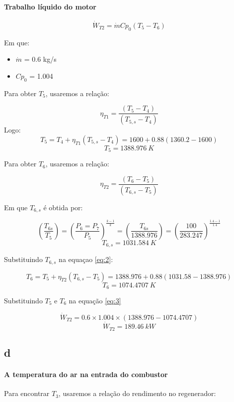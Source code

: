 \paragraph*{Trabalho líquido do motor}

\begin{equation}
\dot{W}_{T2} = \dot{m}Cp_{0}(T_{5}-T_{6})
\label{eq:3}
\end{equation}

Em que:
\begin{itemize}
\item $\dot{m}$ = 0.6 kg/s
\item $Cp_{0}$ = 1.004
\end{itemize}

Para obter $T_{5}$, usaremos a relação:

\[\eta _{T1} = \frac{(T_{5}-T_{4})}{(T_{5,s}-T_{4})}\]
Logo:
\[ T_{5}  = T_{4} + \eta _{T1}(T_{5,s}-T_{4}) = 1600 + 0.88(1360.2-1600)\]
\[T_{5} = 1388.976 \ K\]

Para obter $T_{6}$, usaremos a relação:

\begin{equation}
\eta _{T2} = \frac{(T_{6}-T_{5})}{(T_{6,s}-T_{5})}
\label{eq:2}
\end{equation}

Em que $T_{6,s}$ é obtida por:

\[\left( \frac{T_{6s}}{T_{5}}   \right) = \left( \frac{P_{6} = P_{7}}{P_{5}} \right)^{\frac{k-1}{k}} = \left( \frac{T_{6s}}{1388.976}   \right) = \left( \frac{100}{283.247} \right)^{\frac{1.4-1}{1.4}} \]
\[T_{6,s} = 1031.584 \ K\]

Substituindo $T_{6,s}$ na equaçao \ref{eq:2}:

\[ T_{6}  = T_{5} + \eta _{T2}(T_{6,s}-T_{5}) = 1388.976 + 0.88(1031.58-1388.976)\]
\[T_{6} = 1074.4707 \ K\]

Substituindo $T_{5}$ e $T_{6}$ na equação \ref{eq:3}

\[\dot{W}_{T2} = 0.6 \times 1.004 \times (1388.976 -1074.4707)\]
\[\dot{W}_{T2} = 189.46 \ kW\]

\subsection{d}
\paragraph*{A temperatura do ar na entrada do combustor}

Para encontrar $T_{3}$, usaremos a relação do rendimento no regenerador:

